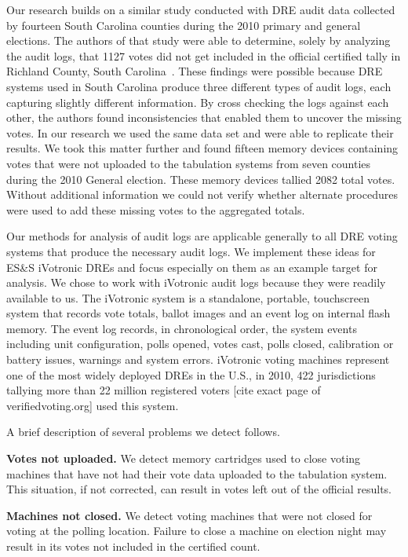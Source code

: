 Our research builds on a similar study conducted with DRE audit data collected by fourteen South Carolina counties during the 2010 primary and general elections.  The authors of that study were able to determine, solely by analyzing the audit logs, that 1127 votes did not get included in the official certified tally in Richland County, South Carolina~\cite{Buell2011}. These findings were possible because DRE systems used in South Carolina produce three different types of audit logs, each capturing slightly different information. By cross checking the logs against each other, the authors found inconsistencies that enabled them to uncover the missing votes. In our research we used the same data set and were able to replicate their results. We took this matter further and found fifteen memory devices containing votes that were not uploaded to the tabulation systems from seven counties during the 2010 General election. These memory devices tallied 2082 total votes. Without additional information we could not verify whether alternate procedures were used to add these missing votes to the aggregated totals. 

Our methods for analysis of audit logs are applicable generally to all DRE voting systems  that produce the necessary audit logs. We implement these ideas for ES\&S iVotronic DREs and focus especially on them as an example target for analysis.  We chose to work with iVotronic audit logs because they were readily available to us. The iVotronic system is a standalone, portable, touchscreen system that records vote totals, ballot images and an event log on internal flash memory. The event log records, in chronological order, the system events including unit configuration, polls opened, votes cast, polls closed, calibration or battery issues, warnings and system errors. iVotronic voting machines represent one of the most widely deployed DREs in the U.S., in 2010, 422 jurisdictions tallying more than 22 million registered voters [cite exact page of verifiedvoting.org] used this system.
 
A brief description of several problems we detect follows.

\textbf{Votes not uploaded.} We detect  memory cartridges used to close voting machines that have not had their vote data uploaded to the tabulation system. This situation, if not corrected, can result in votes left out of the official results.

\textbf{Machines not closed.} We detect voting machines that were not closed for voting at the polling location. Failure to close a machine on election night may result in its votes not included in the certified count.

